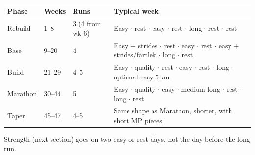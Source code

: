 \documentclass[11pt,a4paper]{article}
\begin{document}
\begin{center}
\begin{tabular}{@{}L{2.2cm}L{1.3cm}L{1.9cm}L{9.6cm}@{}}
\toprule
\textbf{Phase} & \textbf{Weeks} & \textbf{Runs} & \textbf{Typical week} \\
\midrule
Rebuild & 1--8 & 3 (4 from wk 6) & Easy $\cdot$ rest $\cdot$ easy $\cdot$ rest $\cdot$ long $\cdot$ rest $\cdot$ rest \\
Base & 9--20 & 4 & Easy + strides $\cdot$ rest $\cdot$ easy $\cdot$ rest $\cdot$ easy + strides/fartlek $\cdot$ long $\cdot$ rest \\
Build & 21--29 & 4--5 & Easy $\cdot$ quality $\cdot$ rest $\cdot$ easy $\cdot$ rest $\cdot$ long $\cdot$ optional easy 5\,km \\
Marathon & 30--44 & 5 & Easy $\cdot$ quality $\cdot$ easy $\cdot$ medium-long $\cdot$ rest $\cdot$ long $\cdot$ rest \\
Taper & 45--47 & 4--5 & Same shape as Marathon, shorter, with short MP pieces \\
\bottomrule
\end{tabular}
\end{center}

Strength (next section) goes on two easy or rest days, not the day before the long run.
\end{document}
